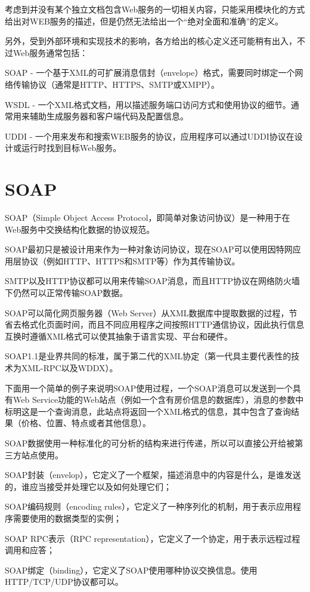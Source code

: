 考虑到并没有某个独立文档包含Web服务的一切相关内容，只能采用模块化的方式给出对WEB服务的描述，但是仍然无法给出一个“绝对全面和准确”的定义。

另外，受到外部环境和实现技术的影响，各方给出的核心定义还可能稍有出入，不过Web服务通常包括：

\begin{compactitem}
\item SOAP - 一个基于XML的可扩展消息信封（envelope）格式，需要同时绑定一个网络传输协议（通常是HTTP、HTTPS、SMTP或XMPP）。

\item WSDL - 一个XML格式文档，用以描述服务端口访问方式和使用协议的细节。通常用来辅助生成服务器和客户端代码及配置信息。

\item UDDI - 一个用来发布和搜索WEB服务的协议，应用程序可以通过UDDI协议在设计或运行时找到目标Web服务。

\end{compactitem}

\section{SOAP}

SOAP（Simple Object Access Protocol，即简单对象访问协议）是一种用于在Web服务中交换结构化数据的协议规范。

SOAP最初只是被设计用来作为一种对象访问协议，现在SOAP可以使用因特网应用层协议（例如HTTP、HTTPS和SMTP等）作为其传输协议。

SMTP以及HTTP协议都可以用来传输SOAP消息，而且HTTP协议在网络防火墙下仍然可以正常传输SOAP数据。

SOAP可以简化网页服务器（Web Server）从XML数据库中提取数据的过程，节省去格式化页面时间，而且不同应用程序之间按照HTTP通信协议，因此执行信息互换时遵循XML格式可以使其抽象于语言实现、平台和硬件。

SOAP1.1是业界共同的标准，属于第二代的XML协定（第一代具主要代表性的技术为XML-RPC以及WDDX）。

下面用一个简单的例子来说明SOAP使用过程，一个SOAP消息可以发送到一个具有Web Service功能的Web站点（例如一个含有房价信息的数据库），消息的参数中标明这是一个查询消息，此站点将返回一个XML格式的信息，其中包含了查询结果（价格、位置、特点或者其他信息）。

SOAP数据使用一种标准化的可分析的结构来进行传递，所以可以直接公开给被第三方站点使用。

\begin{compactitem}
\item SOAP封装（envelop），它定义了一个框架，描述消息中的内容是什么，是谁发送的，谁应当接受并处理它以及如何处理它们；
\item SOAP编码规则（encoding rules），它定义了一种序列化的机制，用于表示应用程序需要使用的数据类型的实例；
\item SOAP RPC表示（RPC representation），它定义了一个协定，用于表示远程过程调用和应答；
\item SOAP绑定（binding），它定义了SOAP使用哪种协议交换信息。使用HTTP/TCP/UDP协议都可以。
\end{compactitem}

